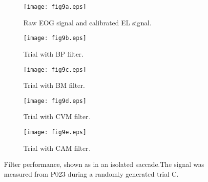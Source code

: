 \documentclass[transmag]{IEEEtran}
\begin{document}
\begin{figure*}
	\centering
	\begin{subfigure}[b]{0.48\textwidth}
		\centering
		\texttt{[image: fig9a.eps]}
		\caption{Raw EOG signal and calibrated EL signal.}
	\end{subfigure}
	\begin{subfigure}[b]{0.48\textwidth}
		\centering
		\texttt{[image: fig9b.eps]}
		\caption{Trial with BP filter.}
	\end{subfigure}
	\hfill
	\begin{subfigure}[b]{0.48\textwidth}
		\centering
		\texttt{[image: fig9c.eps]}
		\caption{Trial with BM filter.}
	\end{subfigure}
	\begin{subfigure}[b]{0.48\textwidth}
		\centering
		\texttt{[image: fig9d.eps]}
		\caption{Trial with CVM filter.}
	\end{subfigure}
	\begin{subfigure}[b]{0.48\textwidth}
		\centering
		\texttt{[image: fig9e.eps]}
		\caption{Trial with CAM filter.}
	\end{subfigure}
	\caption{Filter performance, shown as in an isolated saccade.The signal was measured from P023 during a randomly generated trial C.}
	\label{fig9}
\end{figure*}
\end{document}
